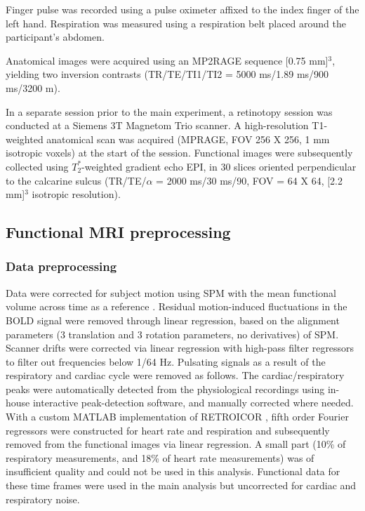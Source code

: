 \documentclass[9pt,lineno]{aperture}
\begin{document}
Finger pulse was recorded using a pulse oximeter affixed to the index finger of the left hand. Respiration was measured using a respiration belt placed around the participant's abdomen.

Anatomical images were acquired using an MP2RAGE sequence \citep{Marques2010} [0.75 mm]$^3$, yielding two inversion contrasts (TR/TE/TI1/TI2 = 5000 ms/1.89 ms/900 ms/3200 m).

In a separate session prior to the main experiment, a retinotopy session was conducted at a Siemens 3T Magnetom Trio scanner. A high-resolution T1-weighted anatomical scan was acquired (MPRAGE, FOV 256 X 256, 1 mm isotropic voxels) at the start of the session. Functional images were subsequently collected using $T_2^*$-weighted gradient echo EPI, in 30 slices oriented perpendicular to the calcarine sulcus (TR/TE/$\alpha$ = 2000 ms/30 ms/90\textdegree, FOV = 64 X 64, [2.2 mm]$^3$ isotropic resolution).

\subsection{Functional MRI preprocessing}
\subsubsection{Data preprocessing}
Data were corrected for subject motion using SPM with the mean functional volume across time as a reference \citep{Friston1995}. Residual motion-induced fluctuations in the BOLD signal were removed through linear regression, based on the alignment parameters (3 translation and 3 rotation parameters, no derivatives) of SPM. Scanner drifts were corrected via linear regression with high-pass filter regressors to filter out frequencies below 1/64 Hz. Pulsating signals as a result of the respiratory and cardiac cycle were removed as follows. The cardiac/respiratory peaks were automatically detected from the physiological recordings using in-house interactive peak-detection software, and manually corrected where needed. With a custom MATLAB implementation of RETROICOR \citep{Glover2000}, fifth order Fourier regressors were constructed for heart rate and respiration and subsequently removed from the functional images via linear regression. A small part (10\% of respiratory measurements, and 18\% of heart rate measurements) was of insufficient quality and could not be used in this analysis. Functional data for these time frames were used in the main analysis but uncorrected for cardiac and respiratory noise.
\end{document}
